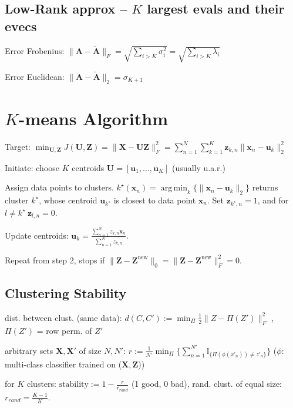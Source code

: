 \documentclass[a4paper, 11pt, landscape]{article}
\newenvironment{inlinelist}%
{\begin{enumerate*}[label=\textbf{\color{red}\theenumi.}]}%
{\end{enumerate*}}
\DeclareMathOperator*{\argmin}{arg\,min}
\begin{document}
\begin{multicols*}{3}
\subsection{Low-Rank approx -- $K$ largest evals and their evecs}
\begin{compactdesc}
	\item[Error Frobenius:] $\|\mathbf{A} - \tilde{\mathbf{A}}\|_F = \sqrt{\sum_{i > K} \sigma_i^2} = \sqrt{\sum_{i > K} \lambda_i}$
	\item[Error Euclidean:] $\|\mathbf{A} - \tilde{\mathbf{A}}\|_2 = \sigma_{K+1}$
\end{compactdesc}

\section{$K$-means Algorithm}
\begin{inparadesc}
	\item[\color{red}Target:] $\min_{\mathbf{U}, \mathbf{Z}} J(\mathbf{U}, \mathbf{Z}) = \|\mathbf{X} - \mathbf{U} \mathbf{Z}\|_F^2 = \sum_{n=1}^N \sum_{k=1}^K \mathbf{z}_{k,n} \|\mathbf{x}_n - \mathbf{u}_k\|_2^2$
\end{inparadesc}
\begin{inlinelist}
	\item Initiate: choose $K$ centroids $\mathbf{U} = [\mathbf{u}_1, \ldots, \mathbf{u}_K]$ (usually u.a.r.)
	\item Assign data points to clusters. $k^\star(\mathbf{x}_n) = \argmin_k \{ \|\mathbf{x}_n - \mathbf{u}_k\|_2 \}$ returns cluster $k^\star$, whose centroid $\mathbf{u}_{k^\star}$ is closest to data point $\mathbf{x}_n$. Set $\mathbf{z}_{k^\star,n} = 1$, and for $ l \neq k^\star~ \mathbf{z}_{l,n}=0$.
	\item Update centroids: $\mathbf{u}_k = \frac{\sum_{n=1}^N z_{k,n} \mathbf{x}_n}{\sum_{n=1}^N z_{k,n}}$.
	\item Repeat from step 2, stops if $\|\mathbf{Z} - \mathbf{Z}^\text{new}\|_0 = \|\mathbf{Z} - \mathbf{Z}^\text{new}\|^2_F = 0$.
\end{inlinelist}

\subsection{Clustering Stability}
\begin{inparaitem}[\color{red}\textbullet]
  \item dist. between clust. (same data): $d(C,C') := \min_\Pi \frac{1}{2}\|Z-\Pi(Z')\|^2_F$ , $\Pi(Z
')$ = row perm. of $Z'$
  \item arbitrary sets $\mathbf{X},\mathbf{X'}$ of size $N,N'$: $r := \frac{1}{N'} \min_{\Pi} \{ \sum_{n=1}^{N'} \mathbb{I}_{\{\Pi(\phi(x'_n)) \neq z'_n\} } \}$ ($\phi$: multi-class classifier trained on ($\mathbf{X},\mathbf{Z}$))
  \item for $K$ clusters: $\text{stability} := 1 - \frac{r}{r_{rand}}$ (1 good, 0 bad), rand. clust. of equal size: $r_{rand} = \frac{K-1}{K}$.
\end{inparaitem}


\end{multicols*}
\end{document}
